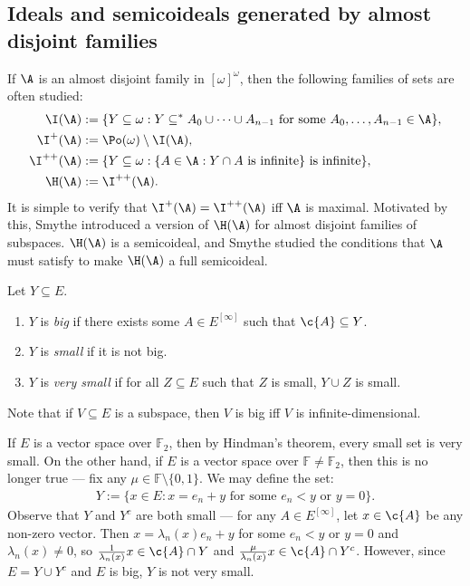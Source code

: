 \documentclass[11pt,reqno]{amsart}
\begin{document}
\subsection{Ideals and semicoideals generated by almost disjoint families}
If $\A$ is an almost disjoint family in $[\omega]^\omega$, then the following families of sets are often studied:
\begin{align*}
    \I(\A) &:= \{Y \subseteq \omega : Y \subseteq^* A_0 \cup \cdots \cup A_{n-1} \text{ for some $A_0,\dots,A_{n-1} \in \A$}\}, \\
    \I^+(\A) &:= \Po(\omega) \setminus \I(\A), \\
    \I^{++}(\A) &:= \{Y \subseteq \omega : \{A \in \A : Y \cap A \text{ is infinite}\} \text{ is infinite}\}, \\
    \H(\A) &:= \I^{++}(\A).
\end{align*}
It is simple to verify that $\I^+(\A) = \I^{++}(\A)$ iff $\A$ is maximal. Motivated by this, Smythe introduced a version of $\H(\A)$ for almost disjoint families of subspaces. $\H(\A)$ is a semicoideal, and Smythe studied the 
conditions that $\A$ must satisfy to make $\H(\A)$ a full semicoideal. 

\begin{definition}
    Let $Y \subseteq E$.
    \begin{enumerate}
        \item $Y$ is \emph{big} if there exists some $A \in E^{[\infty]}$ such that $\c{A} \subseteq Y$.
        
        \item $Y$ is \emph{small} if it is not big.
        
        \item $Y$ is \emph{very small} if for all $Z \subseteq E$ such that $Z$ is small, $Y \cup Z$ is small.
    \end{enumerate}
\end{definition}

Note that if $V \subseteq E$ is a subspace, then $V$ is big iff $V$ is infinite-dimensional.

If $E$ is a vector space over $\mathbb{F}_2$, then by Hindman's theorem, every small set is very small. On the other hand, if $E$ is a vector space over $\mathbb{F} \neq \mathbb{F}_2$, then this is no longer true --- fix any $\mu \in \mathbb{F} \setminus \{0,1\}$. We may define the set:
\begin{align*}
    Y := \{x \in E : x = e_n + y \text{ for some $e_n < y$ or $y = 0$}\}.
\end{align*}
Observe that $Y$ and $Y^c$ are both small --- for any $A \in E^{[\infty]}$, let $x \in \c{A}$ be any non-zero vector. Then $x = \lambda_n(x)e_n + y$ for some $e_n < y$ or $y = 0$ and $\lambda_n(x) \neq 0$, so $\frac{1}{\lambda_n(x)}x \in \c{A} \cap Y$ and $\frac{\mu}{\lambda_n(x)}x \in \c{A} \cap Y^c$. However, since $E = Y \cup Y^c$ and $E$ is big, $Y$ is not very small. 
\end{document}

